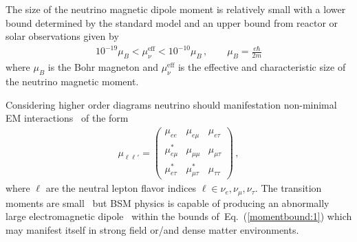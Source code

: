 \documentclass[addchapnum]{ws-rv961x669} %
\newcommand{\req}[1]{Eq.~(\ref{#1})}
\begin{document}
The size of the neutrino magnetic dipole moment is relatively small with a lower bound determined by the standard model and an upper bound from reactor or solar observations given by~\citep{Studenikin:2016ykv,Canas:2015yoa,AristizabalSierra:2021fuc}
\begin{align}
    \label{momentbound:1}
    10^{-19}\mu_{B}<\mu_{\nu}^\mathrm{eff}<10^{-10}\mu_{B}\,,\qquad\mu_{B}=\frac{e\hbar}{2m}
\end{align}
where $\mu_{B}$ is the Bohr magneton and $\mu_{\nu}^\mathrm{eff}$ is the effective and characteristic size of the neutrino magnetic moment.

Considering higher order diagrams neutrino should manifestation non-minimal EM interactions~\citep{Shrock:1980vy} of the form
\begin{gather}
    \label{mu:1}
    \mu_{\ell\ell'}=
	\begin{pmatrix}
		\mu_{ee} & \mu_{e\mu} & \mu_{e\tau} \\
		\mu_{e\mu}^{*} & \mu_{\mu\mu} & \mu_{\mu\tau} \\
		\mu_{e\tau}^{*} & \mu_{\mu\tau}^{*} & \mu_{\tau\tau}
	\end{pmatrix}\,,
\end{gather}
where $\ell$ are the neutral lepton flavor indices $\ell\in\nu_{e},\nu_{\mu},\nu_{\tau}$. The transition moments are small~\cite{Shrock:1980vy} but BSM physics is capable of producing an abnormally large electromagnetic dipole~\citep{Lindner:2017uvt,Brdar:2020quo} within the bounds of~\req{momentbound:1} which may manifest itself in strong field or/and dense matter environments.

\end{document}

